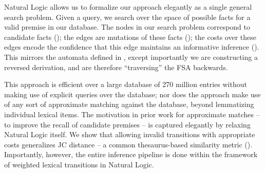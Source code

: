 

Natural Logic allows us to formalize our approach elegantly as
  a single general search problem.
Given a query, we search over the space of possible facts for
  a valid premise in our database.
The nodes in our search problem correspond to candidate facts
  ();
  the edges are mutations of these facts (); 
  the costs over these edges encode the confidence that this edge
  maintains an informative inference ().
This mirrors the automata defined in , except importantly
  we are constructing a reversed derivation, and are therefore
  ``traversing'' the FSA backwards.

This approach is efficient over a large database of 270 million entries
  without making use of explicit queries over the database;
  nor does the approach make use of any sort of approximate
  matching against the database, beyond lemmatizing individual 
  lexical items.
The motivation in prior work for approximate matches --
  to improve the recall of candidate premises -- is captured
  elegantly by relaxing Natural Logic itself.
We show that allowing invalid transitions with appropriate costs
  generalizes JC distance \cite{key:1997jc-similarity} -- a common
  thesaurus-based similarity metric ().
Importantly, however, the entire inference pipeline is done
  within the framework of weighted lexical transitions in Natural
  Logic.


